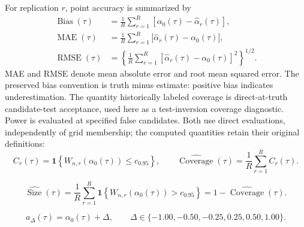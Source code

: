 For replication $r$, point accuracy is summarized by
\begin{equation}
  \begin{aligned}
    \operatorname{Bias}(\tau)
      &=\frac{1}{R}\sum_{r=1}^{R}\left[\alpha_0(\tau)-\widehat{\alpha}_r(\tau)\right], \\
    \operatorname{MAE}(\tau)
      &=\frac{1}{R}\sum_{r=1}^{R}\left|\widehat{\alpha}_r(\tau)-\alpha_0(\tau)\right|, \\
    \operatorname{RMSE}(\tau)
      &=\left\{\frac{1}{R}\sum_{r=1}^{R}\left[\widehat{\alpha}_r(\tau)-\alpha_0(\tau)\right]^2\right\}^{1/2}.
  \end{aligned}
  \label{eq:performance-point}
\end{equation}
MAE and RMSE denote mean absolute error and root mean squared error. The preserved bias convention is truth minus estimate: positive bias indicates underestimation. The quantity historically labeled coverage is direct-at-truth candidate-test acceptance, used here as a test-inversion coverage diagnostic. Power is evaluated at specified false candidates. Both use direct evaluations, independently of grid membership; the computed quantities retain their original definitions:
\begin{equation}
  C_r(\tau)
    =\mathbf{1}\!\left\{W_{n,r}\!\left(\alpha_0(\tau)\right)\leq c_{0.95}\right\},
  \qquad
  \widehat{\operatorname{Coverage}}(\tau)
    =\frac{1}{R}\sum_{r=1}^{R}C_r(\tau).
  \label{eq:performance-coverage}
\end{equation}

\begin{equation}
  \widehat{\operatorname{Size}}(\tau)
    =\frac{1}{R}\sum_{r=1}^{R}
      \mathbf{1}\!\left\{W_{n,r}\!\left(\alpha_0(\tau)\right)>c_{0.95}\right\}
    =1-\widehat{\operatorname{Coverage}}(\tau).
  \label{eq:performance-size}
\end{equation}

\begin{equation}
  a_{\Delta}(\tau)=\alpha_0(\tau)+\Delta,
  \qquad
  \Delta\in\{-1.00,-0.50,-0.25,0.25,0.50,1.00\}.
  \label{eq:performance-alternatives}
\end{equation}

